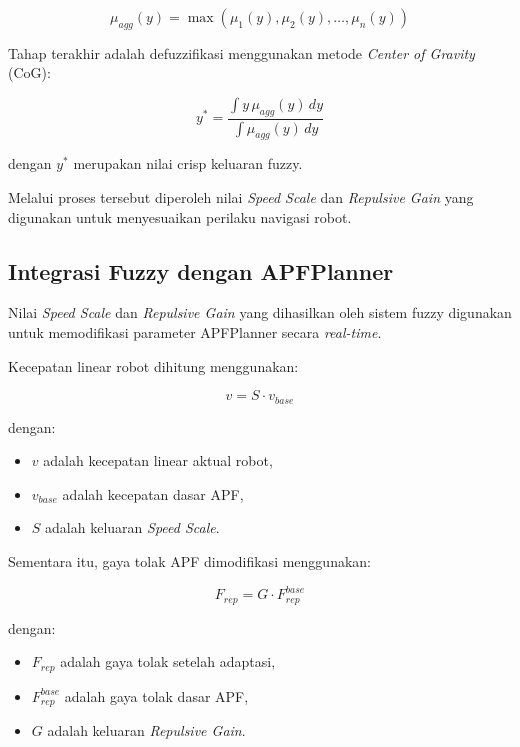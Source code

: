\begin{equation}
\mu_{agg}(y)
=
\max
\left(
\mu_1(y),
\mu_2(y),
\dots,
\mu_n(y)
\right)
\label{eq:fuzzy_aggregation}
\end{equation}

Tahap terakhir adalah defuzzifikasi menggunakan metode \textit{Center of Gravity} (CoG):

\begin{equation}
y^*
=
\frac
{\int y\,\mu_{agg}(y)\,dy}
{\int \mu_{agg}(y)\,dy}
\label{eq:fuzzy_centroid}
\end{equation}

dengan $y^*$ merupakan nilai crisp keluaran fuzzy.

Melalui proses tersebut diperoleh nilai \textit{Speed Scale} dan \textit{Repulsive Gain} yang digunakan untuk menyesuaikan perilaku navigasi robot.

\subsection{Integrasi Fuzzy dengan APFPlanner}

Nilai \textit{Speed Scale} dan \textit{Repulsive Gain} yang dihasilkan oleh sistem fuzzy digunakan untuk memodifikasi parameter APFPlanner secara \textit{real-time}.

Kecepatan linear robot dihitung menggunakan:

\begin{equation}
v
=
S
\cdot
v_{base}
\label{eq:fuzzy_speed_scale}
\end{equation}

dengan:

\begin{itemize}
\item $v$ adalah kecepatan linear aktual robot,
\item $v_{base}$ adalah kecepatan dasar APF,
\item $S$ adalah keluaran \textit{Speed Scale}.
\end{itemize}

Sementara itu, gaya tolak APF dimodifikasi menggunakan:

\begin{equation}
F_{rep}
=
G
\cdot
F_{rep}^{base}
\label{eq:fuzzy_repulsive_gain}
\end{equation}

dengan:

\begin{itemize}
\item $F_{rep}$ adalah gaya tolak setelah adaptasi,
\item $F_{rep}^{base}$ adalah gaya tolak dasar APF,
\item $G$ adalah keluaran \textit{Repulsive Gain}.
\end{itemize}


